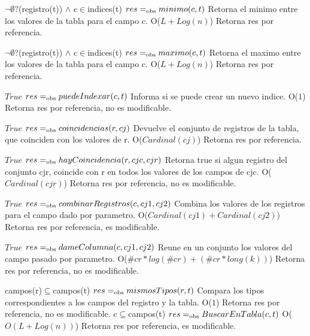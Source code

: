  {$\neg\emptyset$?(registro(t)) $\land$ c$\in$indices(t)}
 {$res =_{\mathrm{obs}} minimo(c,t)$}
 {Retorna el minimo entre los valores de la tabla para el campo c.}
 {O($L+Log(n)$)}
 {Retorna res por referencia.}
  
 {$\neg\emptyset$?(registro(t)) $\land$ c$\in$indices(t)}
 {$res =_{\mathrm{obs}} maximo(c,t)$}
 {Retorna el maximo entre los valores de la tabla para el campo c.}
 {O($L+Log(n)$)}
 {Retorna res por referencia.} 

 {$True$}
 {$res =_{\mathrm{obs}} puedeIndexar(c,t)$}
 {Informa si se puede crear un nuevo indice.}
 {O($1$)}
 {Retorna res por referencia, no es modificable.}

 {$True$}
 {$res =_{\mathrm{obs}} coincidencias(r,cj)$}
 {Devuelve el conjunto de registros de la tabla, que coinciden con los valores de r.}
 {O($Cardinal(cj)$)}
 {Retorna res por referencia.} 

 {$True$}
 {$res =_{\mathrm{obs}} hayCoincidencia(r,cjc,cjr)$}
 {Retorna true si algun registro del conjunto cjr, coincide con r en todos los valores de los campos de cjc.}
 {O($Cardinal(cjr)$)}
 {Retorna res por referencia, no es modificable.} 


 {$True$}
 {$res =_{\mathrm{obs}} combinarRegistros(c,cj1,cj2)$}
 {Combina los valores de los registros para el campo dado por parametro.}
 {O($Cardinal(cj1)+Cardinal(cj2)$)}
 {Retorna res por referencia, es modificable.}

 {$True$}
 {$res =_{\mathrm{obs}} dameColumna(c,cj1,cj2)$}
 {Reune en un conjunto los valores del campo pasado por parametro.}
 {O($\#cr *log(\#cr) + (\#cr *long(k)) $)}
 {Retorna res por referencia, no es modificable.} 

 {campos(r)$\subseteq$campos(t)}
 {$res =_{\mathrm{obs}} mismosTipos(r,t)$}
 {Compara los tipos correspondientes a los campos del registro y la tabla.}
 {O($1$)}
 {Retorna res por referencia, no es modificable.} 
\newpage
 {c$\subseteq$campos(t)}
 {$res =_{\mathrm{obs}} BuscarEnTabla(c, t)$}
 {}
 {O($O(L+Log(n))$)}
 {Retorna res por referencia, es modificable.} 
 

